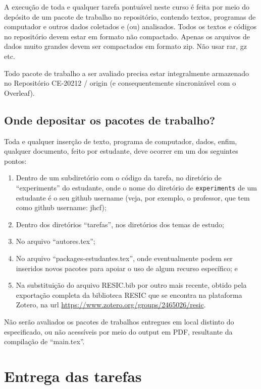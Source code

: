 A execução de toda e qualquer tarefa pontuável neste curso é feita por meio do depósito de um pacote de trabalho no repositório, contendo textos, programas de computador e outros dados coletados e (ou) analisados. Todos os textos e códigos no repositório devem estar em formato não compactado. Apenas os arquivos de dados muito grandes devem ser compactados em formato zip. Não usar rar, gz etc. 

Todo pacote de trabalho a ser avaliado precisa estar integralmente armazenado no Repositório CE-20212 / origin (e consequentemente sincronizável com o Overleaf).

\subsection{Onde depositar os pacotes de trabalho?}

Toda e qualquer inserção de texto, programa de computador, dados, enfim, qualquer documento, feito por estudante, deve ocorrer em um dos seguintes pontos:
\begin{enumerate}
    \item Dentro de um subdiretório com o código da tarefa, no diretório de ``experiments'' do estudante, onde o nome do diretório de \texttt{experiments} de um estudante é o seu github username (veja, por exemplo, o professor, que tem como github username: jhcf);
    \item Dentro dos diretórios ``tarefas'', nos diretórios dos temas de estudo;
    \item No arquivo ``autores.tex'';
    \item No arquivo ``packages-estudantes.tex'', onde eventualmente podem ser inseridos novos pacotes para apoiar o uso de algum recurso específico; e
    \item Na substituição do arquivo RESIC.bib por outro mais recente, obtido pela exportação completa da biblioteca RESIC que se encontra na plataforma Zotero, na url \url{https://www.zotero.org/groups/2465026/resic}.
\end{enumerate}

Não serão avaliados os pacotes de trabalhos entregues em local distinto do especificado, ou não acessíveis por meio do output em PDF, resultante da compilação de ``main.tex''.

\section{Entrega das tarefas}


